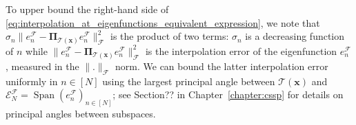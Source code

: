 \documentclass[twoside,11pt]{book}
\newtheorem{theorem}{Theorem}
\numberwithin{theorem}{chapter}
\numberwithin{definition}{chapter}
\numberwithin{proposition}{chapter}
\numberwithin{corollary}{chapter}
\numberwithin{example}{chapter}
\numberwithin{lemma}{chapter}
\numberwithin{assumption}{chapter}
\DeclareMathOperator{\Span}{\mathrm{Span}}
\DeclareMathOperator{\F}{\mathcal{F}}
\begin{document}
To upper bound the right-hand side of \eqref{eq:interpolation_at_eigenfunctions_equivalent_expression}, we note that $\sigma_{n} \|e_{n}^{\F} - \bm{\Pi}_{\mathcal{T}(\bm{x})} e_{n}^{\F}\|_{\mathcal{F}}^{2}$ is the product of two terms: $\sigma_{n}$ is a decreasing function of $n$ while $\|e_{n}^{\F} - \bm{\Pi}_{\mathcal{T}(\bm{x})} e_{n}^{\F}\|_{\mathcal{F}}^{2}$ is the interpolation error of the eigenfunction $e_{n}^{\mathcal{F}}$, measured in the $\|.\|_{\mathcal{F}}$ norm.
We can bound the latter interpolation error uniformly in $n\in [N]$ using the largest principal angle between $\mathcal{T}(\bm{x})$ and $\mathcal{E}^{\mathcal{F}}_{N} = \Span(e_{n}^{\mathcal{F}})_{ n \in [N]}$; see Section?? in Chapter~\ref{chapter:cssp} for details on principal angles between subspaces. 
\end{document}
